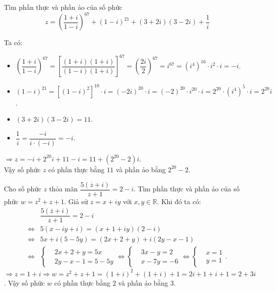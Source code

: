 \begin{bt}%
	Tìm phần thực và phần ảo của số phức
	\[z = \left(\dfrac{1+i}{1-i}\right)^{67} + (1-i)^{21} + (3+2i)(3-2i) + \dfrac{1}{i}\]
	\loigiai 
	{
		Ta có:
		\begin{itemize}
			\item $\left(\dfrac{1+i}{1-i}\right)^{67} = \left[\dfrac{(1+i)(1+i)}{(1-i)(1+i)}\right]^{67} = \left(\dfrac{2i}{2}\right)^{67} = i^{67} = \left(i^4\right)^{16} \cdot i^2 \cdot i = -i$.
			\item $(1-i)^{21} = [(1-i)^2]^{10} \cdot i = (-2i)^{20} \cdot i = (-2)^{20} \cdot i^{20} \cdot i = 2^{20} \cdot (i^4)^5 \cdot i = 2^{20}i$.
			\item $(3+2i)(3-2i) = 11$.
			\item $\dfrac{1}{i} = \dfrac{-i}{i \cdot (-i)} = -i$.
		\end{itemize}
		$\Rightarrow z = -i + 2^{20}i + 11 - i = 11 + \left(2^{20} - 2\right)i$. \\
		Vậy số phức $z$ có phần thực bằng $11$ và phần ảo bằng $2^{20} - 2$.
	}
\end{bt}

\begin{bt}%
	Cho số phức $z$ thỏa mãn $\dfrac{5 \left(\overline{z} + i\right)}{z+1} = 2-i$. Tìm phần thực và phần ảo của số phức $w = z^2+z+1$.
	\loigiai 
	{
		Giả sử $z=x+iy$ với $x,y \in \mathbb{R}$. Khi đó ta có:
		\begin{align*}
		&\dfrac{5 \left(\overline{z} + i\right)}{z+1} = 2-i \\
		\Leftrightarrow & 5(x-iy+i) = (x+1+iy)(2-i)	\\
		\Leftrightarrow & 5x + i(5-5y) = (2x+2+y) + i(2y - x - 1) \\
		\Leftrightarrow & \left\{\begin{aligned} &2x+2+y=5x \\ &2y-x-1=5-5y \end{aligned}\right. \Leftrightarrow \left\{\begin{aligned} &3x-y=2 \\ &x-7y=-6 \end{aligned} \right. \Leftrightarrow \left\{\begin{aligned} &x=1 \\ &y=1 \end{aligned}\right..
		\end{align*}
		$\Rightarrow z=1+i \Rightarrow w = z^2+z+1 = (1+i)^2 + (1+i) + 1 = 2i + 1 + i + 1 = 2 + 3i$. Vậy số phức $w$ có phần thực bằng $2$ và phần ảo bằng $3$.
	}
\end{bt}

